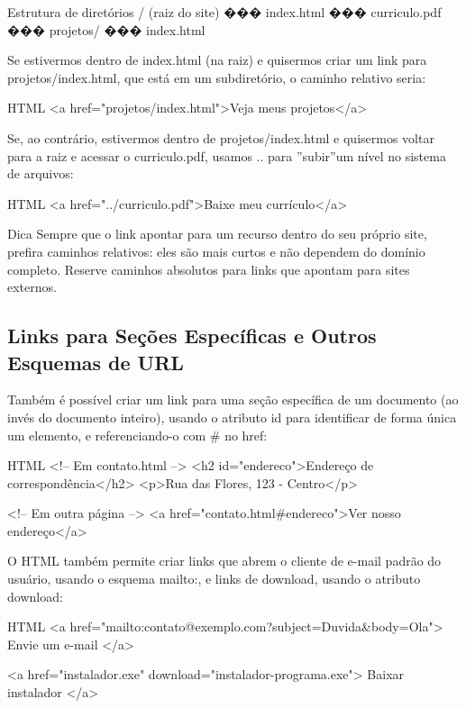 Estrutura de diretórios / (raiz do site) ��� index.html ��� curriculo.pdf ��� projetos/ ��� index.html

Se estivermos dentro de index.html (na raiz) e quisermos criar um link para projetos/index.html, que está em um subdiretório, o caminho relativo seria:

\begin{codebox}{HTML}
<a href="projetos/index.html">Veja meus projetos</a>
\end{codebox}

Se, ao contrário, estivermos dentro de projetos/index.html e quisermos voltar para a raiz e acessar o curriculo.pdf, usamos .. para ”subir”um nível no sistema de arquivos:

\begin{codebox}{HTML}
<a href="../curriculo.pdf">Baixe meu currículo</a>
\end{codebox}

\begin{infobox}{Dica}
Sempre que o link apontar para um recurso dentro do seu próprio site, prefira caminhos relativos: eles são mais curtos e não dependem do domínio completo. Reserve caminhos absolutos para links que apontam para sites externos.
\end{infobox}

\subsection{Links para Seções Específicas e Outros Esquemas de URL}

Também é possível criar um link para uma seção específica de um documento (ao invés do documento inteiro), usando o atributo id para identificar de forma única um elemento, e referenciando-o com \# no href:

\begin{codebox}{HTML}
<!-- Em contato.html -->
<h2 id="endereco">Endereço de correspondência</h2>
<p>Rua das Flores, 123 - Centro</p>

<!-- Em outra página -->
<a href="contato.html#endereco">Ver nosso endereço</a>
\end{codebox}

O HTML também permite criar links que abrem o cliente de e-mail padrão do usuário, usando o esquema mailto:, e links de download, usando o atributo download:

\begin{codebox}{HTML}
<a href="mailto:contato@exemplo.com?subject=Duvida&body=Ola">
  Envie um e-mail
</a>

<a href="instalador.exe" download="instalador-programa.exe">
  Baixar instalador
</a>
\end{codebox}

